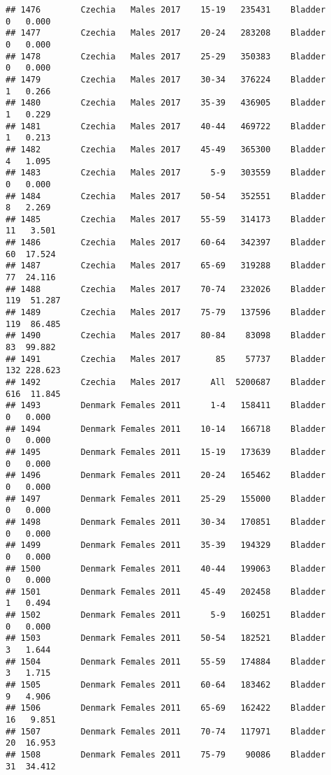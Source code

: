 \documentclass[
]{article}
\begin{document}
\begin{verbatim}
## 1476        Czechia   Males 2017    15-19   235431    Bladder      0   0.000
## 1477        Czechia   Males 2017    20-24   283208    Bladder      0   0.000
## 1478        Czechia   Males 2017    25-29   350383    Bladder      0   0.000
## 1479        Czechia   Males 2017    30-34   376224    Bladder      1   0.266
## 1480        Czechia   Males 2017    35-39   436905    Bladder      1   0.229
## 1481        Czechia   Males 2017    40-44   469722    Bladder      1   0.213
## 1482        Czechia   Males 2017    45-49   365300    Bladder      4   1.095
## 1483        Czechia   Males 2017      5-9   303559    Bladder      0   0.000
## 1484        Czechia   Males 2017    50-54   352551    Bladder      8   2.269
## 1485        Czechia   Males 2017    55-59   314173    Bladder     11   3.501
## 1486        Czechia   Males 2017    60-64   342397    Bladder     60  17.524
## 1487        Czechia   Males 2017    65-69   319288    Bladder     77  24.116
## 1488        Czechia   Males 2017    70-74   232026    Bladder    119  51.287
## 1489        Czechia   Males 2017    75-79   137596    Bladder    119  86.485
## 1490        Czechia   Males 2017    80-84    83098    Bladder     83  99.882
## 1491        Czechia   Males 2017       85    57737    Bladder    132 228.623
## 1492        Czechia   Males 2017      All  5200687    Bladder    616  11.845
## 1493        Denmark Females 2011      1-4   158411    Bladder      0   0.000
## 1494        Denmark Females 2011    10-14   166718    Bladder      0   0.000
## 1495        Denmark Females 2011    15-19   173639    Bladder      0   0.000
## 1496        Denmark Females 2011    20-24   165462    Bladder      0   0.000
## 1497        Denmark Females 2011    25-29   155000    Bladder      0   0.000
## 1498        Denmark Females 2011    30-34   170851    Bladder      0   0.000
## 1499        Denmark Females 2011    35-39   194329    Bladder      0   0.000
## 1500        Denmark Females 2011    40-44   199063    Bladder      0   0.000
## 1501        Denmark Females 2011    45-49   202458    Bladder      1   0.494
## 1502        Denmark Females 2011      5-9   160251    Bladder      0   0.000
## 1503        Denmark Females 2011    50-54   182521    Bladder      3   1.644
## 1504        Denmark Females 2011    55-59   174884    Bladder      3   1.715
## 1505        Denmark Females 2011    60-64   183462    Bladder      9   4.906
## 1506        Denmark Females 2011    65-69   162422    Bladder     16   9.851
## 1507        Denmark Females 2011    70-74   117971    Bladder     20  16.953
## 1508        Denmark Females 2011    75-79    90086    Bladder     31  34.412

\end{verbatim}
\end{document}
